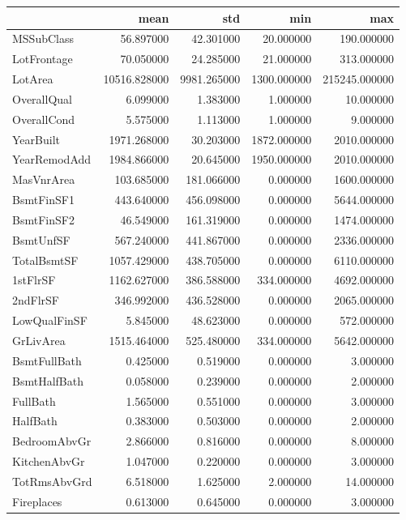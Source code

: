 \begin{tabular}{lrrrr}
\toprule
 & mean & std & min & max \\
\midrule
MSSubClass & 56.897000 & 42.301000 & 20.000000 & 190.000000 \\
LotFrontage & 70.050000 & 24.285000 & 21.000000 & 313.000000 \\
LotArea & 10516.828000 & 9981.265000 & 1300.000000 & 215245.000000 \\
OverallQual & 6.099000 & 1.383000 & 1.000000 & 10.000000 \\
OverallCond & 5.575000 & 1.113000 & 1.000000 & 9.000000 \\
YearBuilt & 1971.268000 & 30.203000 & 1872.000000 & 2010.000000 \\
YearRemodAdd & 1984.866000 & 20.645000 & 1950.000000 & 2010.000000 \\
MasVnrArea & 103.685000 & 181.066000 & 0.000000 & 1600.000000 \\
BsmtFinSF1 & 443.640000 & 456.098000 & 0.000000 & 5644.000000 \\
BsmtFinSF2 & 46.549000 & 161.319000 & 0.000000 & 1474.000000 \\
BsmtUnfSF & 567.240000 & 441.867000 & 0.000000 & 2336.000000 \\
TotalBsmtSF & 1057.429000 & 438.705000 & 0.000000 & 6110.000000 \\
1stFlrSF & 1162.627000 & 386.588000 & 334.000000 & 4692.000000 \\
2ndFlrSF & 346.992000 & 436.528000 & 0.000000 & 2065.000000 \\
LowQualFinSF & 5.845000 & 48.623000 & 0.000000 & 572.000000 \\
GrLivArea & 1515.464000 & 525.480000 & 334.000000 & 5642.000000 \\
BsmtFullBath & 0.425000 & 0.519000 & 0.000000 & 3.000000 \\
BsmtHalfBath & 0.058000 & 0.239000 & 0.000000 & 2.000000 \\
FullBath & 1.565000 & 0.551000 & 0.000000 & 3.000000 \\
HalfBath & 0.383000 & 0.503000 & 0.000000 & 2.000000 \\
BedroomAbvGr & 2.866000 & 0.816000 & 0.000000 & 8.000000 \\
KitchenAbvGr & 1.047000 & 0.220000 & 0.000000 & 3.000000 \\
TotRmsAbvGrd & 6.518000 & 1.625000 & 2.000000 & 14.000000 \\
Fireplaces & 0.613000 & 0.645000 & 0.000000 & 3.000000 \\

\end{tabular}
